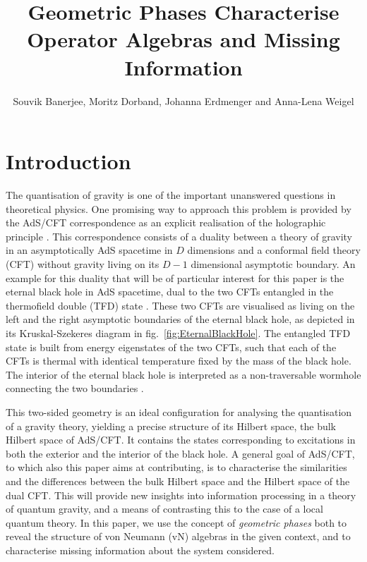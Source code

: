 \documentclass[a4paper,11pt]{article}
\title{Geometric Phases Characterise Operator Algebras and Missing Information}
\author{Souvik Banerjee, Moritz Dorband, Johanna Erdmenger and Anna-Lena Weigel}
\affiliation{Institute for Theoretical Physics and Astrophysics and Würzburg-Dresden Cluster of Excellence ct.qmat, Julius-Maximilians-Universität Würzburg, Am Hubland, 97074 Würzburg, Germany}
\newcommand{\1}{\mathds{1}}
\begin{document}
\maketitle
\flushbottom

\section{Introduction}
The quantisation of gravity is one of the important unanswered questions in theoretical physics. One promising way to approach this problem is provided by the AdS/CFT correspondence \cite{Maldacena:1997re,Witten:1998qj,Gubser:1998bc} as an explicit realisation of the holographic principle \cite{tHooft:1993dmi,Susskind:1994vu}. This correspondence consists of a duality between a theory of gravity in an asymptotically AdS spacetime in $D$ dimensions and a conformal field theory (CFT) without gravity living on its $D-1$ dimensional asymptotic boundary. An example for this duality that will be of particular interest for this paper is the eternal black hole in AdS spacetime, dual to the two CFTs entangled in the thermofield double (TFD) state \cite{Maldacena:2001kr}. These two CFTs are visualised as living on the left and the right asymptotic boundaries of the eternal black hole, as depicted in its Kruskal-Szekeres diagram in fig.~\ref{fig:EternalBlackHole}. The entangled TFD state is built from energy eigenstates of the two CFTs, such that each of the CFTs is thermal with identical temperature fixed by the mass of the black hole. The interior of the eternal black hole is interpreted as a non-traversable wormhole connecting the two boundaries \cite{VanRaamsdonk:2010pw,Maldacena:2013xja}. 

This two-sided geometry is an ideal configuration for analysing the quantisation of a gravity theory, yielding a precise structure of its Hilbert space, the bulk Hilbert space of AdS/CFT. It contains the states corresponding to excitations in both the exterior and the interior of the black hole. A general goal of AdS/CFT, to which also this paper aims at contributing, is to characterise the similarities and the differences between the bulk Hilbert space and the Hilbert space of the dual CFT. This will provide new insights into information processing in a theory of quantum gravity, and a means of contrasting this to the case of a local quantum theory. In this paper, we use the concept of {\it geometric phases} both to reveal the structure of von Neumann (vN) algebras in the given context, and to characterise missing information about the system considered.
\end{document}
